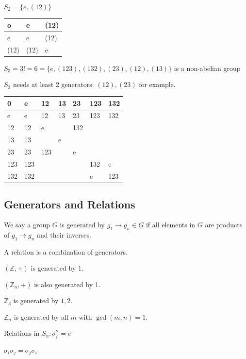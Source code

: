 \documentclass[a4paper,oneside,11pt]{article}
\begin{document}
$S_2=\{e,(12)\}$

\begin{table}[h!]
\begin{tabular}{|l|l|l|}
\hline
o    & e    & (12) \\ \hline
e    & e    & (12) \\ \hline
(12) & (12) & e    \\ \hline
\end{tabular}
\end{table}

$S_3=3!=6=\{e,(123),(132),(23),(12),(13)\}$ is a non-abelian group

$S_3$ needs at least 2 generators: $(12), (23)$ for example.

\begin{table}[h!]
\begin{tabular}{|l|l|l|l|l|l|l|}
\hline
0   & e   & 12  & 13 & 23  & 123 & 132 \\ \hline
e   & e   & 12  & 13 & 23  & 123 & 132 \\ \hline
12  & 12  & e   &    & 132 &     &     \\ \hline
13  & 13  &     & e  &     &     &     \\ \hline
23  & 23  & 123 &    & e   &     &     \\ \hline
123 & 123 &     &    &     & 132 & e   \\ \hline
132 & 132 &     &    &     & e   & 123 \\ \hline
\end{tabular}
\end{table}

\subsection{Generators and Relations}
We say a group $G$ is generated by $g_1\to g_n\in G$ if all elements in $G$ are products of $g_1\to g_n$ and their inverses.

A relation is a combination of generators.

$(\mathbb{Z},+)$ is generated by 1.

$(\mathbb{Z}_n, +)$ is also generated by 1.

$\mathbb{Z}_3$ is generated by $1,2$.

$\mathbb{Z}_n$ is generated by all $m$ with $\gcd(m,n)=1$.

Relations in $S_n: \sigma_i^2=e$

$\sigma_i\sigma_j=\sigma_j\sigma_i$
\end{document}
